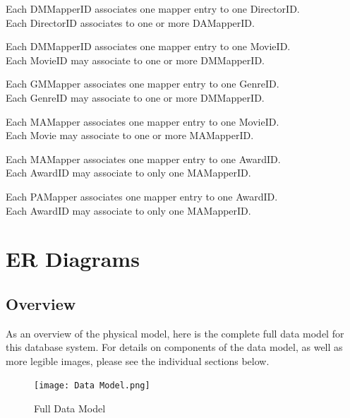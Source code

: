 \documentclass[letterpaper,12pt]{article}
\begin{document}
\begin{itemize}
Each DMMapperID associates one mapper entry to one DirectorID.\\
Each DirectorID associates to one or more DAMapperID.

Each DMMapperID associates one mapper entry to one MovieID.\\
Each MovieID may associate to one or more DMMapperID.

Each GMMapper associates one mapper entry to one GenreID.\\
Each GenreID may associate to one or more DMMapperID.

Each MAMapper associates one mapper entry to one MovieID.\\
Each Movie may associate to one or more MAMapperID.

Each MAMapper associates one mapper entry to one AwardID.\\
Each AwardID may associate to only one MAMapperID.

Each PAMapper associates one mapper entry to one AwardID.\\
Each AwardID may associate to only one MAMapperID.


\end{itemize}

\section{ER Diagrams}
\subsection{Overview}
As an overview of the physical model, here is the complete full data model for this database system.  For details on components of the data model, as well as more legible images, please see the individual sections below.
\begin{figure}[H]
    \centering
    \caption{Full Data Model}
    \label{fig:Full_Data_Model}
    \texttt{[image: Data Model.png]}
\end{figure}
\end{document}

